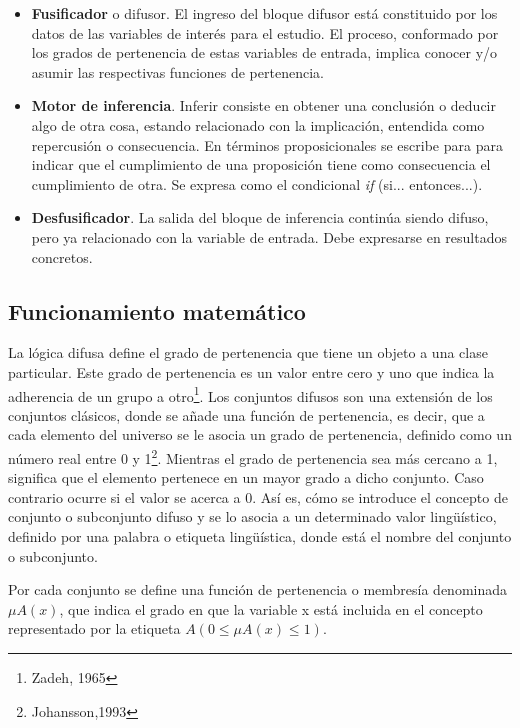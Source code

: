 \documentclass[a4paper, 11pt, titlepage]{article}
\begin{document}
        \begin{itemize}
            \item \textbf{Fusificador} o difusor. El ingreso del bloque difusor está constituido por los 
            datos de las variables de interés para el estudio. El proceso, conformado por 
            los grados de pertenencia de estas variables de entrada, implica conocer y/o 
            asumir las respectivas funciones de pertenencia.
            \item \textbf{Motor de inferencia}. Inferir consiste en obtener una conclusión 
            o deducir algo de otra cosa, estando relacionado con la implicación, entendida como 
            repercusión o consecuencia. En términos proposicionales se escribe para para indicar 
            que el cumplimiento de una proposición tiene como consecuencia el cumplimiento de otra.
            Se expresa como el condicional \textit{if} (si... entonces...).
            \item \textbf{Desfusificador}. La salida del bloque de inferencia continúa siendo difuso,
            pero ya relacionado con la variable de entrada. Debe expresarse en resultados concretos.
        \end{itemize}

    \subsection{Funcionamiento matemático}

        La lógica difusa define el grado de pertenencia que tiene un 
        objeto a una clase particular. Este grado de pertenencia es un valor entre cero y uno que 
        indica la adherencia de un grupo a otro\footnote{
            Zadeh, 1965
        }. Los conjuntos difusos son una extensión 
        de los conjuntos clásicos, donde se añade una función de pertenencia, es decir, que a cada 
        elemento del universo se le asocia un grado de pertenencia, definido como un número real entre 
        0 y 1\footnote{
            Johansson,1993
        }. Mientras el grado de pertenencia sea más cercano a 1, significa que el 
        elemento pertenece en un mayor grado a dicho conjunto. Caso contrario ocurre si el valor se 
        acerca a 0. Así es, cómo se introduce el concepto de conjunto o subconjunto difuso y se lo 
        asocia a un determinado valor lingüístico, definido por una palabra o etiqueta lingüística, 
        donde está el nombre del conjunto o subconjunto. 
        
        Por cada conjunto se define una función de 
        pertenencia o membresía denominada $\mu A(x)$, que indica el grado en que la variable x está incluida 
        en el concepto representado por la etiqueta $A (0 \leq \mu A(x) \leq 1)$. 
\end{document}
